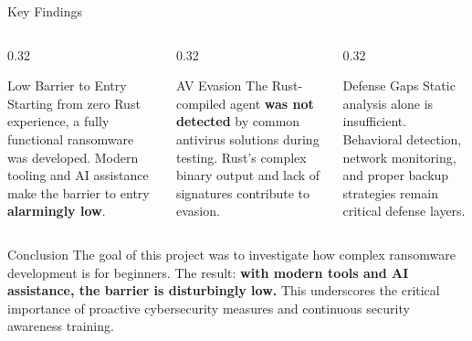 \documentclass[aspectratio=169]{beamer}
\begin{document}
\begin{frame}{Key Findings}
  \begin{columns}[T]
    \begin{column}{0.32\textwidth}
      \begin{block}{Low Barrier to Entry}
        \footnotesize
        Starting from zero Rust experience, a fully functional ransomware was developed. Modern tooling and AI assistance make the barrier to entry \textbf{alarmingly low}.
      \end{block}
    \end{column}
    \begin{column}{0.32\textwidth}
      \begin{block}{AV Evasion}
        \footnotesize
        The Rust-compiled agent \textbf{was not detected} by common antivirus solutions during testing. Rust's complex binary output and lack of signatures contribute to evasion.
      \end{block}
    \end{column}
    \begin{column}{0.32\textwidth}
      \begin{block}{Defense Gaps}
        \footnotesize
        Static analysis alone is insufficient. Behavioral detection, network monitoring, and proper backup strategies remain critical defense layers.
      \end{block}
    \end{column}
  \end{columns}

  \vspace{0.8em}

  \begin{dangerbox}{Conclusion}
    The goal of this project was to investigate how complex ransomware development is for beginners. The result: \textbf{with modern tools and AI assistance, the barrier is disturbingly low.} This underscores the critical importance of proactive cybersecurity measures and continuous security awareness training.
  \end{dangerbox}
\end{frame}
\end{document}
